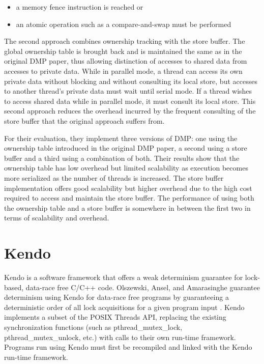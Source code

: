 \begin{itemize}
\item a memory fence instruction is reached or

\item an atomic operation such as a compare-and-swap must be performed
\end{itemize}

The second approach combines ownership tracking with the store buffer.
The global ownership table is brought back and is maintained the same
as in the original DMP paper, thus allowing distinction of accesses to
shared data from accesses to private data.  While in parallel mode, a
thread can access its own private data without blocking and without
consulting its local store, but accesses to another thread's private
data must wait until serial mode.  If a thread wishes to access shared
data while in parallel mode, it must consult its local store.  This
second approach reduces the overhead incurred by the frequent
consulting of the store buffer that the original approach suffers
from.

For their evaluation, they implement three versions of DMP: one using
the ownership table introduced in the original DMP paper, a second
using a store buffer and a third using a combination of both.  Their
results show that the ownership table has low overhead but limited
scalability as execution becomes more serialized as the number of
threads is increased.  The store buffer implementation offers good
scalability but higher overhead due to the high cost required to
access and maintain the store buffer.  The performance of using both
the ownership table and a store buffer is somewhere in between the
first two in terms of scalability and overhead.

\section{Kendo}

Kendo is a software framework that offers a weak determinism guarantee
for lock-based, data-race free C/C++ code.  Olszewski, Ansel, and
Amarasinghe guarantee determinism using Kendo for data-race free
programs by guaranteeing a deterministic order of all lock
acquisitions for a given program input \cite{kendo}.  Kendo implements
a subset of the POSIX Threads API, replacing the existing
synchronization functions (such as pthread\_mutex\_lock,
pthread\_mutex\_unlock, etc.) with calls to their own run-time
framework.  Programs run using Kendo must first be recompiled and
linked with the Kendo run-time framework.

